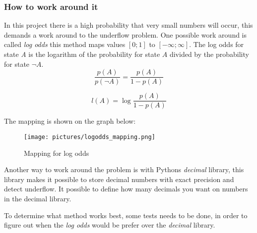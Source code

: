 \subsubsection{How to work around it}
In this project there is a high probability that very small numbers will occur, this demands a work around to the underflow problem. One possible work around is called \textit{log odds} this method maps values $[0;1]$ to $[-\infty; \infty]$. The log odds for state \textit{A} is the logarithm of the probability for state $A$ divided by the probability for state $\neg A$.\\

    $$\frac{p(A)}{p(\neg A)} = \frac{p(A)}{1-p(A)}$$

    $$l(A) = \log \frac{p(A)}{1-p(A)}$$

    The mapping is shown on the graph below:\\
	\begin{figure}
		\centering
		\texttt{[image: pictures/logodds\_mapping.png]}
		\caption{Mapping for log odds}
		\label{fig:log_odds}
	\end{figure}

    Another way to work around the problem is with Pythons \textit{decimal} library, this library makes it possible to store decimal numbers with exact precision and detect underflow. It possible to define how many decimals you want on numbers in the decimal library.

To determine what method works best, some tests needs to be done, in order to figure out when the \textit{log odds} would be prefer over the \textit{decimal} library.
